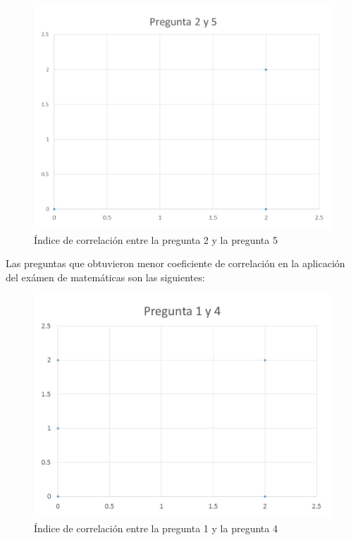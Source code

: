 \documentclass[12pt] {report}
\begin{document}
\begin{figure}[H]
\centering 
\includegraphics[scale=.4]{MCorrelacionmax25.JPG}
\caption{Índice de correlación entre la pregunta 2 y la pregunta 5}
\end{figure}
Las preguntas que obtuvieron menor coeficiente de correlación en la aplicación del exámen de matemáticas son las siguientes:
\begin{figure}[H]
\centering 
\includegraphics[scale=.4]{MCorrelacionmin14.JPG}
\caption{Índice de correlación entre la pregunta 1 y la pregunta 4}
\end{figure}
\end{document}
